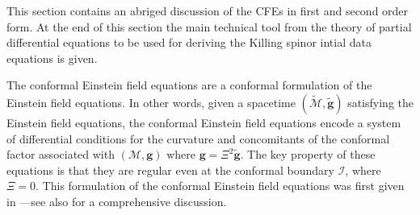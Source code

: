 \documentclass[10pt,a4paper]{article}
\theoremstyle{plain}
\def\bmg{{\bm g}}
\begin{document}



\medskip

This section contains an abriged discussion of the CFEs in first and second order form.
At the end of this section the main technical tool from the theory of partial differential
equations to be used for deriving the Killing spinor intial data equations is given.

\medskip
 

The conformal Einstein field equations are a conformal formulation of
the Einstein field equations. In other words, given a spacetime
$(\tilde{\mathcal{M}},\tilde{\bmg})$ satisfying the Einstein field
equations, the conformal Einstein field equations encode a system of
differential conditions for the curvature and concomitants of the
conformal factor associated with $(\mathcal{M},\bmg)$ where
$\bmg=\Xi^2\tilde{\bmg}$. The key property of these equations is that
they are regular even at the conformal boundary $\mathscr{I}$, where
$\Xi=0$.  This formulation of the conformal Einstein field equations
was first given in \cite{Fri81a} ---see also \cite{CFEbook} for a
comprehensive discussion.

\medskip
\end{document}
